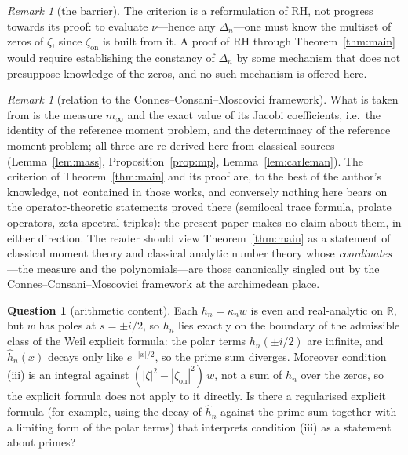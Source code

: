 \documentclass[11pt]{amsart}
\theoremstyle{definition}
\newtheorem{question}[theorem]{Question}
\theoremstyle{remark}
\newtheorem{remark}[theorem]{Remark}
\newcommand{\bbR}{\mathbb{R}}
\newcommand{\minf}{m_\infty}
\newcommand{\zon}{\zeta_{\mathrm{on}}}
\begin{document}
\begin{remark}[the barrier]\label{rem:barrier}
The criterion is a reformulation of RH, not progress towards its proof: to
evaluate $\nu$---hence any $\Delta_n$---one must know the multiset of zeros
of $\zeta$, since $\zon$ is built from it. A proof of RH through
Theorem~\ref{thm:main} would require establishing the constancy of
$\Delta_n$ by some mechanism that does not presuppose knowledge of the
zeros, and no such mechanism is offered here.
\end{remark}

\begin{remark}[relation to the Connes--Consani--Moscovici framework]
\label{rem:ccm}
What is taken from \cite{CCMprolate,CCMq,CCMtriples} is the measure $\minf$
and the exact value of its Jacobi coefficients, i.e.\ the identity of the
reference moment problem, and the determinacy of the reference moment
problem; all three are re-derived here from classical sources
(Lemma~\ref{lem:mass}, Proposition~\ref{prop:mp}, Lemma~\ref{lem:carleman}). The criterion of
Theorem~\ref{thm:main} and its proof are, to the best of the author's
knowledge, not contained in those works, and conversely nothing here bears
on the operator-theoretic statements proved there (semilocal trace formula,
prolate operators, zeta spectral triples): the present paper makes no claim
about them, in either direction. The reader should view
Theorem~\ref{thm:main} as a statement of classical moment theory and
classical analytic number theory whose \emph{coordinates}---the measure and
the polynomials---are those canonically singled out by the
Connes--Consani--Moscovici framework at the archimedean place.
\end{remark}

\begin{question}[arithmetic content]\label{q:arith}
Each $h_n=\kappa_n w$ is even and real-analytic on $\bbR$, but $w$ has
poles at $s=\pm i/2$, so $h_n$ lies exactly on the boundary of the
admissible class of the Weil explicit formula: the polar terms
$h_n(\pm i/2)$ are infinite, and $\widehat h_n(x)$ decays only like
$e^{-|x|/2}$, so the prime sum diverges.
Moreover condition (iii) is an integral against
$(|\zeta|^2-|\zon|^2)\,w$, not a sum of $h_n$ over the zeros, so the
explicit formula does not apply to it directly. Is there a regularised explicit
formula (for example, using the decay of $\widehat h_n$ against the prime
sum together with a limiting form of the polar terms) that interprets
condition (iii) as a statement about primes?
\end{question}
\end{document}

